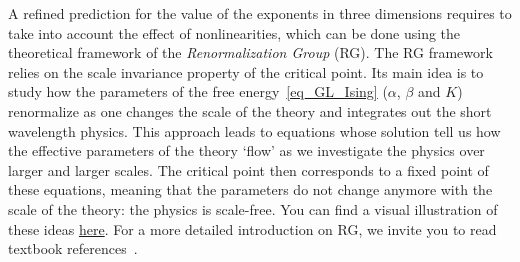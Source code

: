 A refined prediction for the value of the exponents in three dimensions requires to take into account the effect of nonlinearities, which can be done using the theoretical framework of the \emph{Renormalization Group} (RG).
The RG framework relies on the scale invariance property of the critical point.
Its main idea is to study how the parameters of the free energy~\eqref{eq_GL_Ising} ($\alpha$, $\beta$ and $K$) renormalize as one changes the scale of the theory and integrates out the short wavelength physics. 
This approach leads to equations whose solution tell us how the effective parameters of the theory `flow' as we investigate the physics over larger and larger scales. 
The critical point then corresponds to a fixed point of these equations, meaning that the parameters do not change anymore with the scale of the theory: the physics is scale-free.
You can find a visual illustration of these ideas \href{https://www.youtube.com/watch?v=MxRddFrEnPc}{here}.
For a more detailed introduction on RG, we invite you to read textbook references~\cite{Goldenfeld1992,Kardar2007}. 




